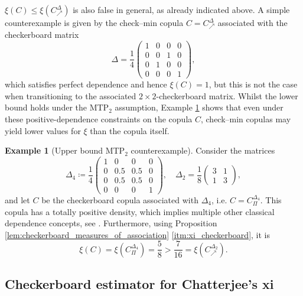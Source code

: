 \documentclass{article}
\theoremstyle{definition}
\newtheorem{example}[thm]{Example}
\begin{document}
$\xi(C)\leq\xi(C^{\Delta}_{\nearrow})$ is also false in general, as already indicated above.
A simple counterexample is given by the check--min copula $C=C^{\Delta}_{\nearrow}$ associated with the checkerboard matrix
\[
    \Delta = \frac{1}{4}\begin{pmatrix}
        1 & 0 & 0 & 0 \\
        0 & 0 & 1 & 0 \\
        0 & 1 & 0 & 0 \\
        0 & 0 & 0 & 1
    \end{pmatrix}
,\]
which satisfies perfect dependence and hence $\xi(C)=1$, but this is not the case when transitioning to the associated $2\times 2$-checkerboard matrix.
Whilst the lower bound holds under the MTP$_2$ assumption, Example \ref{ex:xi_bounds_counterexample_1} shows that even under these positive-dependence constraints on the copula $C$, check--min copulas may yield lower values for $\xi$ than the copula itself.

\begin{example}[Upper bound MTP$_2$ counterexample]
    \label{ex:xi_bounds_counterexample_1}
    Consider the matrices
    \[
        \Delta_4 \coloneq \frac{1}{4}\begin{pmatrix}
            1 & 0 & 0 & 0 \\
            0 & 0.5 & 0.5 & 0 \\
            0 & 0.5 & 0.5 & 0 \\
            0 & 0 & 0 & 1
        \end{pmatrix},
        \quad \Delta_2 = \frac{1}{8}\begin{pmatrix}
            3 & 1 \\
            1 & 3
        \end{pmatrix}
    ,\]
    and let $C$ be the checkerboard copula associated with $\Delta_4$, i.e. $C = C^{\Delta_4}_{\Pi}$.
    This copula has a totally positive density, which implies multiple other classical dependence concepts, see \cite[Figure 1]{fuchs2023total}.
    Furthermore, using Proposition \ref{lem:checkerboard_measures_of_association} \ref{itm:xi_checkerboard}, it is
    \[
        \xi(C)
        = \xi\left(C^{\Delta_4}_{\Pi}\right)
        = \frac58
        > \frac7{16}
        = \xi\left(C^{\Delta_2}_{\nearrow}\right)
    .\]
\end{example}


\subsection{Checkerboard estimator for Chatterjee's xi}
\label{subsec:xi_estimates}
\end{document}

